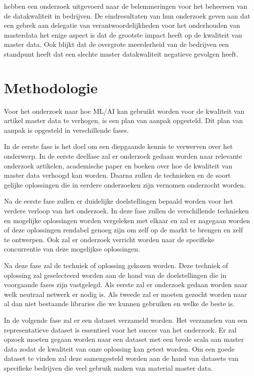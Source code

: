 \textcite{ Haug2011a} hebben een onderzoek uitgevoerd naar de belemmeringen voor het beheersen van de datakwaliteit in bedrijven. De eindresultaten van hun onderzoek geven aan dat een gebrek aan delegatie van verantwoordelijkheden voor het onderhouden van masterdata het enige aspect is dat de grootste impact heeft op de kwaliteit van master data. Ook blijkt dat de overgrote meerderheid van de bedrijven een standpunt heeft dat een slechte master datakwaliteit negatieve gevolgen heeft. 

\section{Methodologie}%
\label{sec:methodologie}

Voor het onderzoek naar hoe ML/AI kan gebruikt worden voor de kwaliteit van artikel master data te verhogen, is een plan van aanpak opgesteld. Dit plan van aanpak is opgesteld in verschillende fases. 

In de eerste fase is het doel om een diepgaande kennis te verwerven over het onderwerp. In de eerste deelfase zal er onderzoek gedaan worden naar relevante onderzoek artikelen, academische paper en boeken over hoe de kwaliteit van master data verhoogd kan worden. Daarna zullen de technieken en de soort gelijke oplossingen die in eerdere onderzoeken zijn vernomen onderzocht worden. 

Na de eerste fase zullen er duidelijke doelstellingen bepaald worden voor het verdere verloop van het onderzoek. In deze fase zullen de verschillende technieken en mogelijke oplossingen worden vergeleken met elkaar en zal er nagegaan worden of deze oplossingen rendabel genoeg zijn om zelf op de markt te brengen en zelf te ontwerpen. Ook zal er onderzoek verricht worden naar de specifieke concurrentie van deze mogelijkse oplossingen. 

Na deze fase zal de techniek of oplossing gekozen worden. Deze techniek of oplossing zal geselecteerd worden aan de hand van de doelstellingen die in voorgaande fases zijn vastgelegd. Als eerste zal er onderzoek gedaan worden naar welk neutraal netwerk er nodig is. Als tweede zal er moeten gezocht worden naar al dan niet bestaande libraries die we kunnen gebruiken en welke de beste is.

In de volgende fase zal er een dataset verzameld worden. Het verzamelen van een representatieve dataset is essentieel voor het succes van het onderzoek. Er zal opzoek moeten gegaan worden naar een dataset met een brede scala aan master data zodat de kwaliteit van onze oplossing kan getest worden. Om een goede dataset te vinden zal deze samengesteld worden aan de hand van datasets van specifieke bedrijven die veel gebruik maken van material master data.

